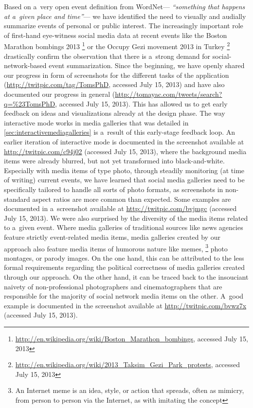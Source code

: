 Based on a~very open event definition from WordNet---%
\textit{``something that happens at a~given place and time''}---%
we have identified the need to
visually and audially summarize events
of personal or public interest.
The increasingly important role of first-hand eye-witness
social media data at recent events like the
Boston Marathon bombings 2013%
\footnote{\url{http://en.wikipedia.org/wiki/Boston_Marathon_bombings}, accessed July 15, 2013}
or the Occupy Gezi movement 2013 in Turkey%
\footnote{\url{http://en.wikipedia.org/wiki/2013_Taksim_Gezi_Park_protests}, accessed July 15, 2013}
drastically confirm the observation that there is a~strong demand
for social-network-based event summarization.
Since the beginning, we have openly shared our progress
in form of screenshots for the different tasks
of the application
(\url{http://twitpic.com/tag/TomsPhD}, accessed July 15, 2013)
and have also documented our progress in general
(\url{http://tomayac.com/tweets/search?q=%23TomsPhD}, accessed July 15, 2013).
This has allowed us to get early feedback on ideas
and visualizations already at the design phase.
The way interactive mode works in media galleries
that was detailed in \autoref{sec:interactivemediagalleries}
is a~result of this early-stage feedback loop. 
An earlier iteration of interactive mode
is documented in the screenshot available at
\url{http://twitpic.com/c94j02} (accessed July 15, 2013),
where the background media items were already blurred,
but not yet transformed into black-and-white.
Especially with media items of type photo,
through steadily monitoring (at time of writing) current events,
we have learned that social media galleries
need to be specifically tailored to handle all sorts of photo formats,
as screenshots in non-standard aspect ratios
are more common than expected.
Some examples are documented in a~screenshot available
at \url{http://twitpic.com/bvjmgc} (accessed July 15, 2013).
We were also surprised by the diversity of the media items
related to a~given event.
Where media galleries of traditional sources
like news agencies feature strictly event-related media items,
media galleries created by our approach also feature
media items of humorous nature like memes,%
\footnote{An Internet meme is an idea, style, or action that spreads, often as mimicry, from person to person via the Internet, as with imitating the concept}
photo montages,
or parody images.
On the one hand, this can be attributed to the less formal requirements
regarding the political correctness of media galleries 
created through our approach.
On the other hand, it can be traced back to the insouciant naivety
of non-professional photographers and cinematographers
that are responsible for the majority of social network media items on the other.
A~good example is documented in the screenshot available at
\url{http://twitpic.com/bvwz7x} (accessed July 15, 2013).

